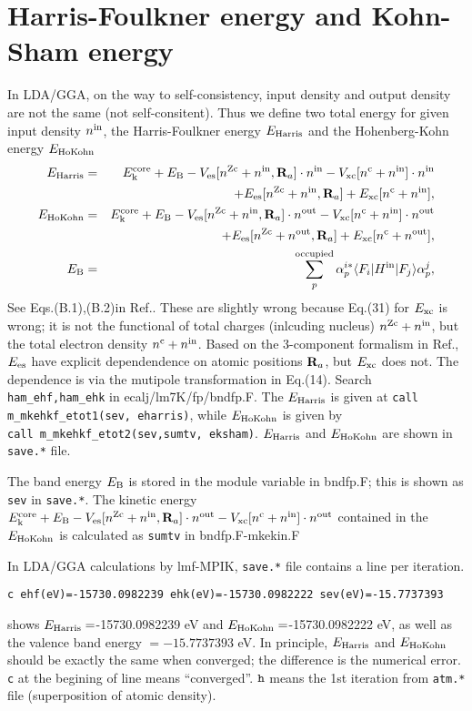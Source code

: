 \documentclass[a4paper,10pt,fleqn]{article}
\def\nc{n^{\rm c}}
\def\nzc{n^{\rm Zc}}
\def\ehf{E_{\rm Harris}}
\def\nin{n^{\rm in}}
\def\nout{n^{\rm out}}
\newcommand{\bfR}{{\bf R}}
\def\ehf{E_{\rm Harris}}
\def\ehk{E_{\rm HoKohn}}
\begin{document}
\section{Harris-Foulkner energy and Kohn-Sham energy}
In LDA/GGA, on the way to self-consistency, input density and output
density are not the same (not self-consitent). 
Thus  we define two total energy for given input density $\nin$,
the Harris-Foulkner energy $\ehf$ and the Hohenberg-Kohn energy $\ehk$ 
\begin{eqnarray}
\ehf &=& E_{\rm k}^{\rm core} + E_{\rm B} 
- V_{\rm es}[\nzc+\nin,\bfR_a] \cdot \nin 
- V_{\rm xc}[\nc+\nin] \cdot \nin \nonumber \\
&&+ E_{\rm es}[\nzc+\nin,\bfR_a] + E_{\rm xc}[\nc+\nin],\label{eq:ehf} \\
\ehk &=& E_{\rm k}^{\rm core} + E_{\rm B} 
- V_{\rm es}[\nzc+\nin,\bfR_a] \cdot \nout 
- V_{\rm xc}[\nc+\nin] \cdot \nout \nonumber \\
&&+ E_{\rm es}[\nzc+\nout,\bfR_a] + E_{\rm xc}[\nc+\nout], \label{eq:ehf} \\
E_{\rm B} &=& \sum_p^{\rm occupied}
\alpha_{p}^{i*} 
\langle F_i|H^{\rm in}|F_j \rangle 
\alpha_p^j,
\label{eq:ebhf}
\end{eqnarray}
See Eqs.(B.1),(B.2)in Ref.\cite{kotani_formulation_2015}.
These are slightly wrong because Eq.(31) for $E_{\rm xc}$ is wrong; it is 
not the functional of total charges (inlcuding nucleus) $\nzc+\nin$, 
but the total electron density $\nc+\nin$.
Based on the 3-component formalism in Ref.\cite{kotani_formulation_2015},
$E_{\rm es}$ have explicit dependendence on atomic positions $\bfR_a$, but $E_{\rm xc}$ does not. 
The dependence is via the mutipole transformation in Eq.(14).
Search \verb#ham_ehf,ham_ehk# in ecalj/lm7K/fp/bndfp.F.
The $\ehf$ is given at \verb#call m_mkehkf_etot1(sev, eharris)#, while
$\ehk$ is given by\\ \verb#call m_mkehkf_etot2(sev,sumtv, eksham)#.
$\ehf$ and $\ehk$ are shown in {\tt save.*} file.

The band energy $E_{\rm B}$ is stored in the module variable in bndfp.F;
this is shown as \verb#sev# in {\tt save.*}. The kinetic energy  
$E_{\rm k}^{\rm core}+E_{\rm B} 
- V_{\rm es}[\nzc+\nin,\bfR_a] \cdot \nout 
- V_{\rm xc}[\nc+\nin] \cdot \nout$ contained in
the $\ehk$ is calculated as \verb#sumtv# in bndfp.F-mkekin.F 

In LDA/GGA calculations by lmf-MPIK, {\tt save.*} file contains a line per iteration.
\begin{verbatim}
c ehf(eV)=-15730.0982239 ehk(eV)=-15730.0982222 sev(eV)=-15.7737393
\end{verbatim}
shows $\ehf=$-15730.0982239 eV and $\ehk=$-15730.0982222 eV, as well as the valence 
band energy $=-15.7737393$ eV. 
In principle, $\ehf$ and $\ehk$ should be exactly the same when converged;
 the difference is the numerical error. {\tt c} at the begining of line means ``converged''. 
${\tt h}$ means the 1st iteration from {\tt atm.*} file (superposition of atomic density).
\end{document}
